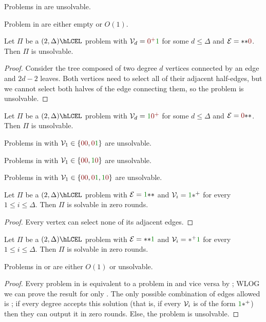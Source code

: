 \documentclass[12pt,a4paper]{article}
\begin{document}
\begin{lem}
    Problems in \emp are unsolvable.
\end{lem}
\begin{lem}
    Problem in \Tloc are either empty or $O(1)$.
\end{lem}
\begin{lem}
    Let $\Pi$ be a $(2,\Delta)\hLCEL$ problem with $\Vc_d=\npl\y$ for some $d\leq\Delta$ and $\Ec=\x\x\n$. Then $\Pi$ is unsolvable.
\end{lem}
\begin{proof}
    Consider the tree composed of two degree $d$ vertices connected by an edge and $2d-2$ leaves. Both vertices need to select all of their adjacent half-edges, but we cannot select both halves of the edge connecting them, so the problem is unsolvable.
\end{proof}
\begin{cor}
    Let $\Pi$ be a $(2,\Delta)\hLCEL$ problem with $\Vc_d=\y\npl$ for some $d\leq\Delta$ and $\Ec=\n\x\x$. Then $\Pi$ is unsolvable.
\end{cor}
\begin{cor}\label{cor:uns-eg}
    Problems in  with $\Vc_1\in\Set{\n\n,\n\y}$ are unsolvable.
\end{cor}
\begin{cor}
    Problems in  with $\Vc_1\in\Set{\n\n,\y\n}$ are unsolvable.
\end{cor}
\begin{cor}\label{cor:uns-or}
    Problems in  with $\Vc_1\in\Set{\n\n,\n\y,\y\n}$ are unsolvable.
\end{cor}
\begin{lem}\label{lem:all-empty}
    Let $\Pi$ be a $(2,\Delta)\hLCEL$ problem with $\Ec=\y\x\x$ and $\Vc_i=\y\xpl$ for every $1\leq i\leq \Delta$. Then $\Pi$ is solvable in zero rounds.
\end{lem}
\begin{proof}
    Every vertex can select none of its adjacent edges.
\end{proof}
\begin{cor}
    Let $\Pi$ be a $(2,\Delta)\hLCEL$ problem with $\Ec=\x\x\y$ and $\Vc_i=\xpl\y$ for every $1\leq i\leq \Delta$. Then $\Pi$ is solvable in zero rounds.
\end{cor}
\begin{lem}
    Problems in  or  are either $O(1)$ or unsolvable.
\end{lem}
\begin{proof}
    Every problem in  is equivalent to a problem in  and vice versa by ; WLOG we can prove the result for only . The only possible combination of edges allowed is ; if every degree accepts this solution (that is, if every $\mathcal{V}_i$ is of the form $\y\xpl$) then they can output it in zero rounds. Else, the problem is unsolvable.
\end{proof}
\end{document}
